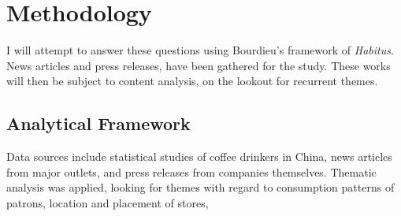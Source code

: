 \chapter{Methodology}\label{sec:methodology}

I will attempt to answer these questions using Bourdieu's framework of
\emph{Habitus}. News articles and press releases, have been gathered for the
study. These works will then be subject to content analysis, on the lookout for
recurrent themes.

\section{Analytical Framework}\label{subs:analyticf}

Data sources include statistical studies of coffee drinkers in China,
news articles from major outlets, and press releases from companies
themselves. Thematic analysis was applied, looking for themes with regard to
consumption patterns of patrons, location and placement of stores, 

